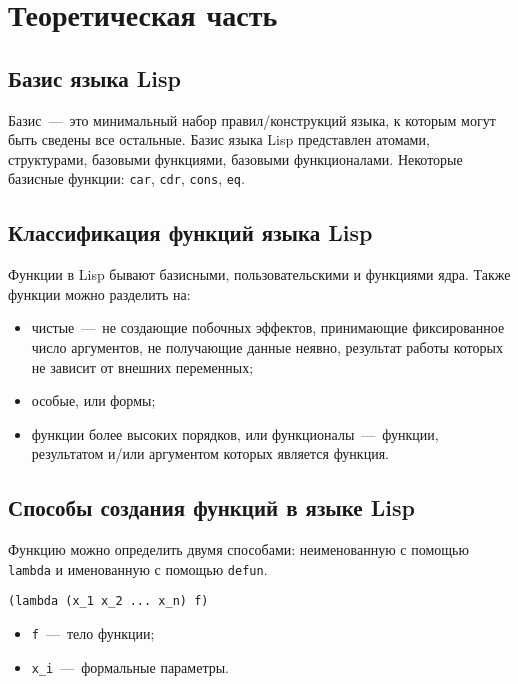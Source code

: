 \setcounter{page}{3}
\chapter{Теоретическая часть}
\section{Базис языка Lisp}
Базис~---~это минимальный набор правил/конструкций языка, к которым могут быть сведены все остальные. Базис языка Lisp представлен атомами, структурами, базовыми функциями, базовыми функционалами. Некоторые базисные функции: \texttt{car}, \texttt{cdr}, \texttt{cons}, \texttt{eq}.

\section{Классификация функций языка Lisp}
Функции в Lisp бывают базисными, пользовательскими и функциями ядра. Также функции можно разделить на:

\begin{itemize}
	\item чистые~---~не создающие побочных эффектов, принимающие фиксированное число аргументов, не получающие данные неявно, результат работы которых не зависит от внешних переменных;
	\item особые, или формы;
	\item функции более высоких порядков, или функционалы~---~функции, результатом и/или аргументом которых является функция.
\end{itemize}

\section{Способы создания функций в языке Lisp}
Функцию можно определить двумя способами: неименованную с помощью \texttt{lambda} и именованную с помощью \texttt{defun}.

\begin{code}
\begin{verbatim}
(lambda (x_1 x_2 ... x_n) f)
\end{verbatim}
\end{code}

\begin{itemize}
	\item \texttt{f}~---~тело функции;
	\item \texttt{x\_i}~---~формальные параметры.
\end{itemize}

